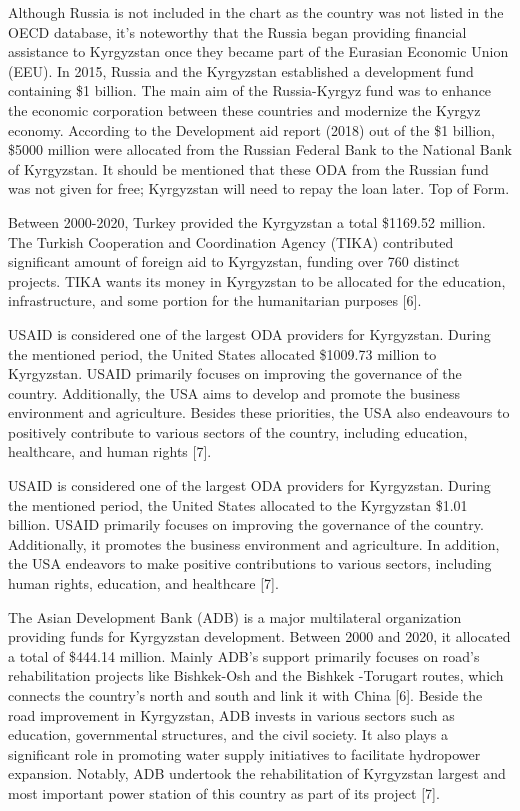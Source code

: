 \begin{multicols}{2}
Although Russia is not included in the chart as the country was not
listed in the OECD database, it's noteworthy that the Russia began
providing financial assistance to Kyrgyzstan once they became part of
the Eurasian Economic Union (EEU). In 2015, Russia and the Kyrgyzstan
established a development fund containing \$1 billion. The main aim of
the Russia-Kyrgyz fund was to enhance the economic corporation between
these countries and modernize the Kyrgyz economy. According to the
Development aid report (2018) out of the \$1 billion, \$5000 million
were allocated from the Russian Federal Bank to the National Bank of
Kyrgyzstan. It should be mentioned that these ODA from the Russian fund
was not given for free; Kyrgyzstan will need to repay the loan later.
Top of Form.

Between 2000-2020, Turkey provided the Kyrgyzstan a total \$1169.52
million. The Turkish Cooperation and Coordination Agency (TIKA)
contributed significant amount of foreign aid to Kyrgyzstan, funding
over 760 distinct projects. TIKA wants its money in Kyrgyzstan to be
allocated for the education, infrastructure, and some portion for the
humanitarian purposes {[}6{]}.

USAID is considered one of the largest ODA providers for Kyrgyzstan.
During the mentioned period, the United States allocated \$1009.73
million to Kyrgyzstan. USAID primarily focuses on improving the
governance of the country. Additionally, the USA aims to develop and
promote the business environment and agriculture. Besides these
priorities, the USA also endeavours to positively contribute to various
sectors of the country, including education, healthcare, and human
rights {[}7{]}.

USAID is considered one of the largest ODA providers for Kyrgyzstan.
During the mentioned period, the United States allocated to the
Kyrgyzstan \$1.01 billion. USAID primarily focuses on improving the
governance of the country. Additionally, it promotes the business
environment and agriculture. In addition, the USA endeavors to make
positive contributions to various sectors, including human rights,
education, and healthcare {[}7{]}.

The Asian Development Bank (ADB) is a major multilateral organization
providing funds for Kyrgyzstan development. Between 2000 and 2020, it
allocated a total of \$444.14 million. Mainly ADB's support primarily
focuses on road's rehabilitation projects like Bishkek-Osh and the
Bishkek -Torugart routes, which connects the country's north and south
and link it with China {[}6{]}. Beside the road improvement in
Kyrgyzstan, ADB invests in various sectors such as education,
governmental structures, and the civil society. It also plays a
significant role in promoting water supply initiatives to facilitate
hydropower expansion. Notably, ADB undertook the rehabilitation of
Kyrgyzstan largest and most important power station of this country as
part of its project {[}7{]}.


\end{multicols}
